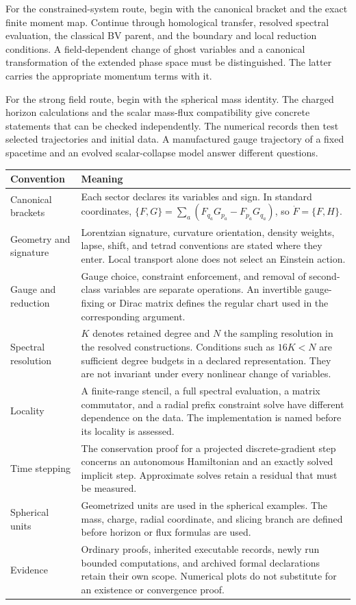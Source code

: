 For the constrained-system route, begin with the canonical bracket and the exact finite moment map. Continue through homological transfer, resolved spectral evaluation, the classical BV parent, and the boundary and local reduction conditions. A field-dependent change of ghost variables and a canonical transformation of the extended phase space must be distinguished. The latter carries the appropriate momentum terms with it.

For the strong field route, begin with the spherical mass identity. The charged horizon calculations and the scalar mass-flux compatibility give concrete statements that can be checked independently. The numerical records then test selected trajectories and initial data. A manufactured gauge trajectory of a fixed spacetime and an evolved scalar-collapse model answer different questions.

\begin{longtable}{@{}L{.25\linewidth}L{.66\linewidth}@{}}
\toprule
Convention & Meaning\\\midrule\endhead
Canonical brackets & Each sector declares its variables and sign. In standard coordinates, $\{F,G\}=\sum_a(F_{q_a}G_{p_a}-F_{p_a}G_{q_a})$, so $\dot F=\{F,H\}$.\\
Geometry and signature & Lorentzian signature, curvature orientation, density weights, lapse, shift, and tetrad conventions are stated where they enter. Local transport alone does not select an Einstein action.\\
Gauge and reduction & Gauge choice, constraint enforcement, and removal of second-class variables are separate operations. An invertible gauge-fixing or Dirac matrix defines the regular chart used in the corresponding argument.\\
Spectral resolution & $K$ denotes retained degree and $N$ the sampling resolution in the resolved constructions. Conditions such as $16K<N$ are sufficient degree budgets in a declared representation. They are not invariant under every nonlinear change of variables.\\
Locality & A finite-range stencil, a full spectral evaluation, a matrix commutator, and a radial prefix constraint solve have different dependence on the data. The implementation is named before its locality is assessed.\\
Time stepping & The conservation proof for a projected discrete-gradient step concerns an autonomous Hamiltonian and an exactly solved implicit step. Approximate solves retain a residual that must be measured.\\
Spherical units & Geometrized units are used in the spherical examples. The mass, charge, radial coordinate, and slicing branch are defined before horizon or flux formulas are used.\\
Evidence & Ordinary proofs, inherited executable records, newly run bounded computations, and archived formal declarations retain their own scope. Numerical plots do not substitute for an existence or convergence proof.\\
\bottomrule
\end{longtable}

\clearpage
\begingroup
\setlength{\parskip}{0pt}
\setlength{\cftbeforesecskip}{4pt}
\setlength{\cftbeforepartskip}{10pt}

\endgroup
\clearpage


